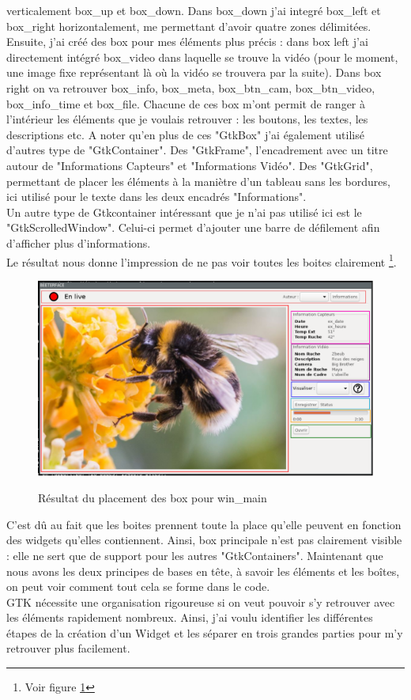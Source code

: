 \documentclass[11pt,french,a4paper]{report}
\begin{document}
verticalement box\_up et box\_down. Dans box\_down j'ai integré box\_left et box\_right horizontalement, me permettant d'avoir 
quatre zones délimitées. \\
Ensuite, j'ai créé des box pour mes éléments plus précis : dans box left j'ai directement intégré box\_video dans laquelle 
se trouve la vidéo (pour le moment, une image fixe représentant là où la vidéo se trouvera par la suite). 
Dans box right on va retrouver box\_info, box\_meta, box\_btn\_cam, box\_btn\_video, box\_info\_time et box\_file. 
Chacune de ces box m'ont permit de ranger à l'intérieur les éléments que je voulais retrouver : 
les boutons, les textes, les descriptions etc. 
A noter qu'en plus de ces "GtkBox" j'ai également utilisé d'autres type de "GtkContainer". Des "GtkFrame", l'encadrement
avec un titre autour de "Informations Capteurs" et "Informations Vidéo". Des "GtkGrid", permettant de placer les éléments 
à la maniètre d'un tableau sans les bordures, ici utilisé pour le texte dans les deux encadrés "Informations". \\
Un autre type de Gtkcontainer intéressant que je n'ai pas utilisé ici est le "GtkScrolledWindow". Celui-ci permet d'ajouter
une barre de défilement afin d'afficher plus d'informations. \\
Le résultat nous donne l'impression de ne pas voir toutes les boites clairement \footnote{Voir figure \ref{res_box_win_main}}. \\
\begin{figure}[!h]
    \centering
        \includegraphics[scale=0.45]{../images/dia/schema_bloc_win_applique.png} \\
        \caption{Résultat du placement des box pour win\_main}
        \label{res_box_win_main}
\end{figure}
C'est dû au fait que les boites prennent toute la place qu'elle peuvent en fonction des widgets qu'elles contiennent. Ainsi, box principale 
n'est pas clairement visible : elle ne sert que de support pour les autres "GtkContainers". 
Maintenant que nous avons les deux principes de bases en tête, à savoir les éléments et les boîtes, on peut voir comment 
tout cela se forme dans le code. \\
GTK nécessite une organisation rigoureuse si on veut pouvoir s'y retrouver avec les éléments rapidement nombreux.
Ainsi, j'ai voulu identifier les différentes étapes de la création d'un Widget et les séparer en 
trois grandes parties pour m'y retrouver plus facilement. \\
\end{document}
